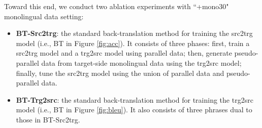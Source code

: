 \documentclass[letterpaper]{article} %
\begin{document}
Toward this end, we conduct two ablation experiments with ``+mono30" monolingual data setting:

\begin{itemize}
\item \textbf{BT-Src2trg}: the standard back-translation method for training the src2trg model (i.e., BT in Figure \ref{fig:acc}).
It consists of three phases:
first, train a src2trg model and a trg2src model using parallel data;
then, generate pseudo-parallel data from target-side monolingual data using the trg2src model;
finally, tune the src2trg model using the union of parallel data and pseudo-parallel data.
\item \textbf{BT-Trg2src}: the standard back-translation method for training the trg2src model (i.e., BT in Figure \ref{fig:bleu}).
It also consists of three phrases dual to those in BT-Src2trg.
\end{itemize}




\end{document}
